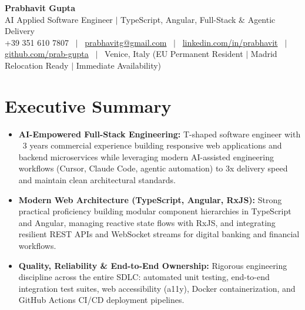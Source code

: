 \documentclass[a4paper,10pt]{article}
\begin{document}
\begin{minipage}[c]{0.80\textwidth}
  {\Huge\bfseries Prabhavit Gupta}\\[3pt]
  {\color{accent}\large AI Applied Software Engineer $\vert$ TypeScript, Angular, Full-Stack $\&$ Agentic Delivery}\\[6pt]
  {\footnotesize +39 351 610 7807 ~$\vert$~
  \href{mailto:prabhavitg@gmail.com}{prabhavitg@gmail.com} ~$\vert$~
  \href{https://www.linkedin.com/in/prabhavit/}{linkedin.com/in/prabhavit} ~$\vert$~
  \href{https://github.com/prab-gupta}{github.com/prab-gupta} ~$\vert$~
  Venice, Italy (EU Permanent Resident $\vert$ Madrid Relocation Ready $\vert$ Immediate Availability)}
\end{minipage}\hfill

\vspace{6pt}

\section{Executive Summary}
\begin{itemize}
  \item \textbf{AI-Empowered Full-Stack Engineering:} T-shaped software engineer with ~3 years commercial experience building responsive web applications and backend microservices while leveraging modern AI-assisted engineering workflows (Cursor, Claude Code, agentic automation) to 3x delivery speed and maintain clean architectural standards.
  \item \textbf{Modern Web Architecture (TypeScript, Angular, RxJS):} Strong practical proficiency building modular component hierarchies in TypeScript and Angular, managing reactive state flows with RxJS, and integrating resilient REST APIs and WebSocket streams for digital banking and financial workflows.
  \item \textbf{Quality, Reliability \& End-to-End Ownership:} Rigorous engineering discipline across the entire SDLC: automated unit testing, end-to-end integration test suites, web accessibility (a11y), Docker containerization, and GitHub Actions CI/CD deployment pipelines.
\end{itemize}

\end{document}
